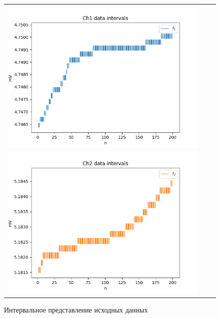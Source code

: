 \documentclass[a4paper,14pt]{article}
\begin{document}
	\begin{figure}[H]
		\begin{tabular}{ccc}
			\includegraphics[scale=0.5]{../image/intervals_PR1.png}
			\includegraphics[scale=0.5]{../image/intervals_PR2.png}
		\end{tabular}
		\caption{Интервальное представление исходных данных} 
	\end{figure}
	
\end{document}
